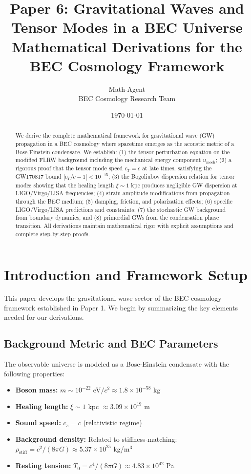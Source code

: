 \documentclass[11pt,a4paper]{article}
\title{\textbf{Paper 6: Gravitational Waves and Tensor Modes in a BEC Universe}\\[0.5em]
\large Mathematical Derivations for the BEC Cosmology Framework}
\author{Math-Agent\\[0.3em]
\small BEC Cosmology Research Team}
\date{\today}
\newcommand{\rhostiff}{\ensuremath{\rho_{\mathrm{stiff}}}}
\newcommand{\Tzero}{\ensuremath{T_0}}
\newcommand{\cs}{\ensuremath{c_s}}
\newcommand{\cT}{\ensuremath{c_T}}
\newcommand{\umech}{\ensuremath{u_{\mathrm{mech}}}}
\theoremstyle{definition}
\theoremstyle{remark}
\begin{document}
\maketitle

\begin{abstract}
We derive the complete mathematical framework for gravitational wave (GW) propagation in a BEC cosmology where spacetime emerges as the acoustic metric of a Bose-Einstein condensate. We establish: (1) the tensor perturbation equation on the modified FLRW background including the mechanical energy component $\umech$; (2) a rigorous proof that the tensor mode speed $\cT = c$ at late times, satisfying the GW170817 bound $|\cT/c - 1| < 10^{-15}$; (3) the Bogoliubov dispersion relation for tensor modes showing that the healing length $\xi \sim 1$ kpc produces negligible GW dispersion at LIGO/Virgo/LISA frequencies; (4) strain amplitude modifications from propagation through the BEC medium; (5) damping, friction, and polarization effects; (6) specific LIGO/Virgo/LISA predictions and constraints; (7) the stochastic GW background from boundary dynamics; and (8) primordial GWs from the condensation phase transition. All derivations maintain mathematical rigor with explicit assumptions and complete step-by-step proofs.
\end{abstract}

\tableofcontents
\newpage

\section{Introduction and Framework Setup}
\label{sec:introduction}

This paper develops the gravitational wave sector of the BEC cosmology framework established in Paper 1. We begin by summarizing the key elements needed for our derivations.

\subsection{Background Metric and BEC Parameters}
\label{sec:background}

The observable universe is modeled as a Bose-Einstein condensate with the following properties:

\begin{itemize}[leftmargin=*, itemsep=0.3em]
\item \textbf{Boson mass:} $m \sim 10^{-22}$ eV$/c^2 \approx 1.8 \times 10^{-58}$ kg
\item \textbf{Healing length:} $\xi \sim 1$ kpc $\approx 3.09 \times 10^{19}$ m
\item \textbf{Sound speed:} $\cs = c$ (relativistic regime)
\item \textbf{Background density:} Related to stiffness-matching: $\rhostiff = c^2/(8\pi G) \approx 5.37 \times 10^{25}$ kg/m$^3$
\item \textbf{Resting tension:} $\Tzero = c^4/(8\pi G) \approx 4.83 \times 10^{42}$ Pa
\end{itemize}
\end{document}
